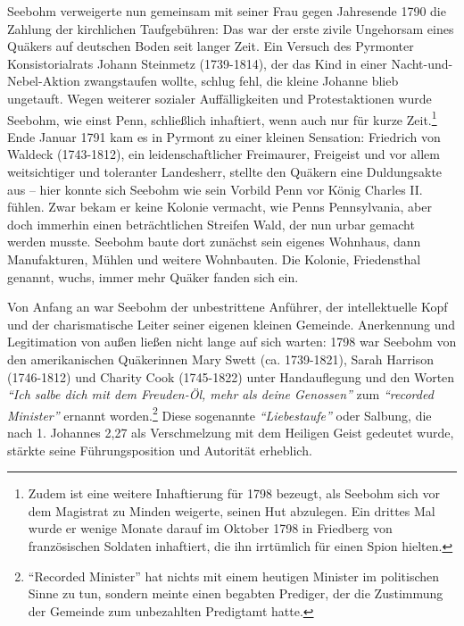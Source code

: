 \medskip

Seebohm verweigerte nun gemeinsam mit seiner Frau gegen Jahresende 1790 die
Zahlung der kirchlichen Taufgebühren: Das war der erste
zivile Ungehorsam eines Quäkers auf deutschen Boden
seit langer Zeit. Ein Versuch des Pyrmonter Konsistorialrats Johann
Steinmetz (1739-1814), der das Kind in einer
Nacht-und-Nebel-Aktion zwangstaufen wollte, schlug fehl, die kleine
Johanne blieb ungetauft. Wegen weiterer
sozialer Auffälligkeiten und Protestaktionen wurde
Seebohm, wie einst Penn, schließlich
inhaftiert, wenn auch nur für kurze
Zeit.\footnote{Zudem ist eine weitere Inhaftierung für 1798 bezeugt, als Seebohm
sich vor
dem Magistrat zu Minden weigerte, seinen Hut abzulegen. Ein drittes Mal wurde er
wenige Monate darauf im Oktober 1798 in Friedberg von französischen Soldaten
inhaftiert, die ihn irrtümlich für einen Spion hielten.} Ende Januar 1791 kam es
in Pyrmont zu einer kleinen Sensation: Friedrich von
Waldeck (1743-1812), ein
leidenschaftlicher Freimaurer, Freigeist und vor
allem weitsichtiger und toleranter Landesherr, stellte den Quäkern eine
Duldungsakte aus -- hier konnte sich Seebohm wie sein
Vorbild Penn vor König Charles II. fühlen.
Zwar bekam er keine Kolonie vermacht, wie Penns Pennsylvania, aber doch
immerhin einen beträchtlichen Streifen Wald, der nun urbar gemacht werden
musste. Seebohm baute dort zunächst sein eigenes Wohnhaus, dann Manufakturen,
Mühlen und weitere Wohnbauten. Die Kolonie,
Friedensthal genannt, wuchs, immer mehr Quäker fanden
sich ein.

\medskip

Von Anfang an war Seebohm der unbestrittene Anführer, der intellektuelle Kopf
und der charismatische Leiter seiner eigenen kleinen Gemeinde. Anerkennung und
Legitimation von außen ließen nicht lange auf sich warten: 1798 war Seebohm von
den amerikanischen Quäkerinnen Mary Swett (ca.
1739-1821), Sarah Harrison (1746-1812) und Charity Cook (1745-1822) unter Handauflegung und den Worten \textit{"`Ich salbe dich mit dem
Freuden-Öl, mehr als deine Genossen"'} zum \textit{"`recorded Minister"'} ernannt worden.\footnote{"`Recorded Minister"' hat nichts mit einem
heutigen Minister im politischen
Sinne zu tun, sondern meinte einen begabten Prediger, der die Zustimmung der
Gemeinde zum unbezahlten Predigtamt hatte.} Diese sogenannte
\textit{"`Liebestaufe"'} oder Salbung, die nach
1. Johannes 2,27 als Verschmelzung mit dem Heiligen Geist
gedeutet wurde, stärkte seine Führungsposition und Autorität erheblich.

